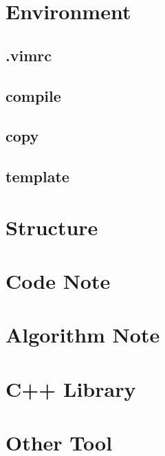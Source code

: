 \documentclass[a4paper, landscape, 8pt]{article}
\begin{document}
\begin{multicols*}{3}
\maketitle
\tableofcontents

\section{Environment}
\subsection{.vimrc}

\subsection{compile}

\subsection{copy}

\subsection{template}


\section{Structure}


\section{Code Note}


\section{Algorithm Note}


\section{C++ Library}


\section{Other Tool}

\end{multicols*}
\end{document}
